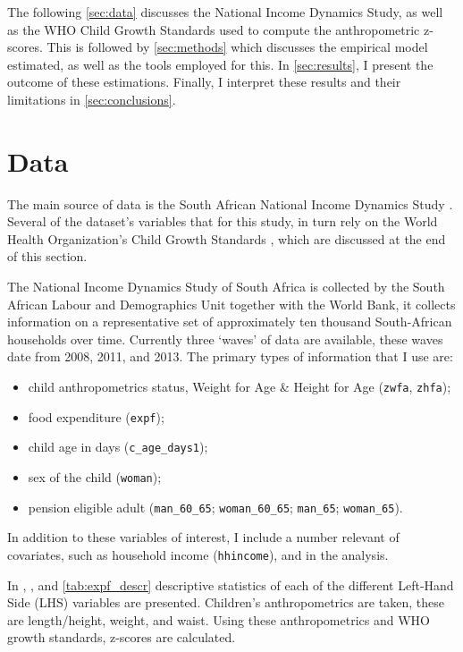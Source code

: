 \documentclass[a4paper,british]{article}\usepackage[]{graphicx}\usepackage[]{color}
\newcommand{\code}[1]{\texttt{#1}}
\let\ref\autoref
\begin{document}
The following \ref{sec:data} discusses the National Income Dynamics
Study, as well as the WHO Child Growth Standards used to compute the
anthropometric z-scores. This is followed by \ref{sec:methods} which
discusses the empirical model estimated, as well as the tools employed
for this. In \ref{sec:results}, I present the outcome of these estimations.
Finally, I interpret these results and their limitations in \ref{sec:conclusions}.


\section{Data}

\label{sec:data}The main source of data is the South African National
Income Dynamics Study \citep[NIDS,][]{saldru2008nids,saldru2012nids,saldru2013nids}.
Several of the dataset's variables that for this study, in turn rely
on the World Health Organization's Child Growth Standards \citep{who2006child},
which are discussed at the end of this section.

The National Income Dynamics Study of South Africa is collected by
the South African Labour and Demographics Unit together with the World
Bank, it collects information on a representative set of approximately
ten thousand South-African households over time. Currently three `waves'
of data are available, these waves date from 2008, 2011, and 2013.
The primary types of information that I use are: 
\begin{itemize}
\item child anthropometrics status, Weight for Age \& Height for Age (\code{zwfa},
\code{zhfa});
\item food expenditure (\code{expf});
\item child age in days (\code{c\_age\_days1});
\item sex of the child (\code{woman}); 
\item pension eligible adult (\code{man\_60\_65}; \code{woman\_60\_65};
\code{man\_65}; \code{woman\_65}).
\end{itemize}
In addition to these variables of interest, I include a number relevant
of covariates, such as household income (\code{hhincome}), and in
the analysis.

In , , and \ref{tab:expf_descr}
descriptive statistics of each of the different Left-Hand Side (LHS)
variables are presented. Children's anthropometrics are taken, these
are length/height, weight, and waist. Using these anthropometrics
and WHO growth standards, z-scores are calculated.
\end{document}
